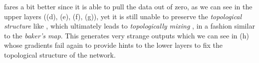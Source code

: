 \begin{figure}
{{    %
    }
    \parbox{.195\textwidth}{%
    }
  }
  \caption{\ReLUBN}
    \label{fig:moonsReLUBN}
\end{figure}

\ReLUBN fares a bit better since it is able to pull the data out of zero, as we can see in the upper layers ((d), (e), (f), (g)), yet it is still unable to preserve the \emph{topological structure} like \ReLU, which ultimately leads to \emph{topologically mixing} \cite{hirsch2012differential}, in a fashion similar to the \emph{baker's map}. This generates very strange outputs which we can see in (h) whose gradients fail again to provide hints to the lower layers to fix the topological structure of the network. 

